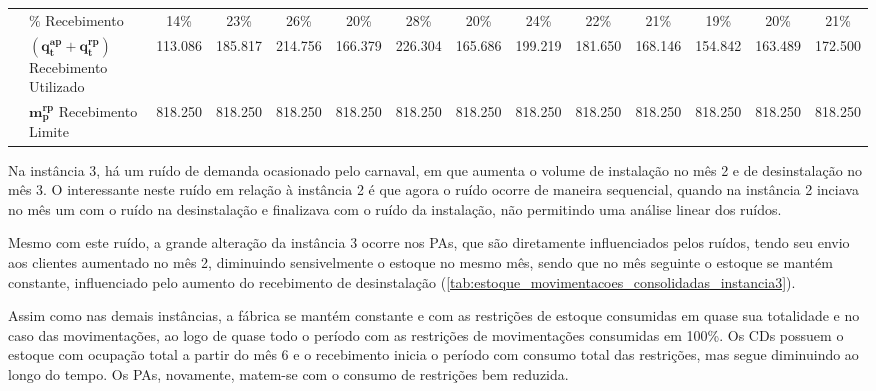 \begin{table}
{\begin{tabular}{|l|l|c|c|c|c|c|c|c|c|c|c|c|c|}
& $\mathbf{\%}$ Recebimento & 14\% & 23\% & 26\% & 20\% & 28\% & 20\% & 24\% & 22\% & 21\% & 19\% & 20\% & 21\% \\\cline{2-14}
& $(\mathbf{q^{ap}_{t} + q^{rp}_{t}})$ Recebimento Utilizado & 113.086 & 185.817 & 214.756 & 166.379 & 226.304 & 165.686 & 199.219 & 181.650 & 168.146 & 154.842 & 163.489 & 172.500 \\\cline{2-14}
& $\mathbf{m^{rp}_{p}}$ Recebimento Limite & 818.250 & 818.250 & 818.250 & 818.250 & 818.250 & 818.250 & 818.250 & 818.250 & 818.250 & 818.250 & 818.250 & 818.250 \\
\hline
\end{tabular}%
}
\fdadospesquisa
\end{table}

Na instância 3, há um ruído de demanda ocasionado pelo carnaval, em que aumenta o volume de instalação no mês 2 e de desinstalação no mês 3. O interessante neste ruído em relação à instância 2 é que agora o ruído ocorre de maneira sequencial, quando na instância 2 inciava no mês um com o ruído na desinstalação e finalizava com o ruído da instalação, não permitindo uma análise linear dos ruídos.

Mesmo com este ruído, a grande alteração da instância 3 ocorre nos PAs, que são diretamente influenciados pelos ruídos, tendo seu envio aos clientes aumentado no mês 2, diminuindo sensivelmente o estoque no mesmo mês, sendo que no mês seguinte o estoque se mantém constante, influenciado pelo aumento do recebimento de desinstalação (\autoref{tab:estoque_movimentacoes_consolidadas_instancia3}).

Assim como nas demais instâncias, a fábrica se mantém constante e com as restrições de estoque consumidas em quase sua totalidade e no caso das movimentações, ao logo de quase todo o período com as restrições de movimentações consumidas em 100\%. Os CDs possuem o estoque com ocupação total a partir do mês 6 e o recebimento inicia o período com consumo total das restrições, mas segue diminuindo ao longo do tempo. Os PAs, novamente, matem-se com o consumo de restrições bem reduzida.

